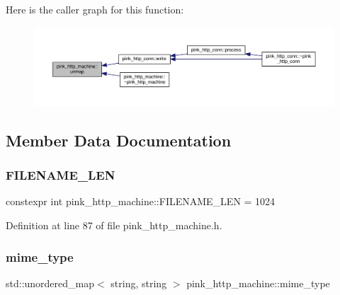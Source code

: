 Here is the caller graph for this function\+:
\nopagebreak
\begin{figure}[H]
\begin{center}
\leavevmode
\includegraphics[width=350pt]{classpink__http__machine_a26debab8c361df5c79966f11e2b2dd17_icgraph}
\end{center}
\end{figure}


\subsection{Member Data Documentation}
\mbox{\label{classpink__http__machine_a33993ee83910b37ae5672c6e6c94cac3}} 
\subsubsection{\texorpdfstring{F\+I\+L\+E\+N\+A\+M\+E\+\_\+\+L\+EN}{FILENAME\_LEN}}
{\footnotesize\ttfamily constexpr int pink\+\_\+http\+\_\+machine\+::\+F\+I\+L\+E\+N\+A\+M\+E\+\_\+\+L\+EN = 1024\hspace{0.3cm}{\ttfamily [static]}}



Definition at line 87 of file pink\+\_\+http\+\_\+machine.\+h.

\mbox{\label{classpink__http__machine_a4373363c5bd675e182f502d300157aa9}} 
\subsubsection{\texorpdfstring{mime\+\_\+type}{mime\_type}}
{\footnotesize\ttfamily std\+::unordered\+\_\+map$<$ string, string $>$ pink\+\_\+http\+\_\+machine\+::mime\+\_\+type\hspace{0.3cm}{\ttfamily [static]}}


